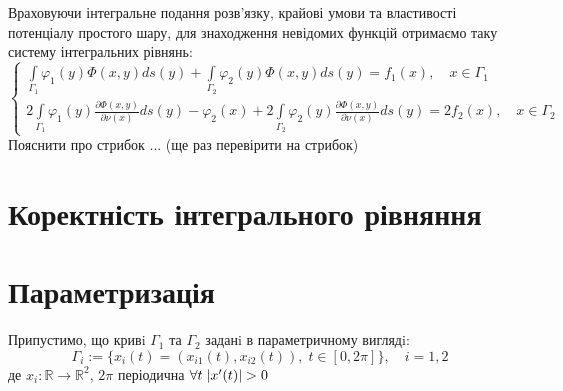 \documentclass[14pt,a4paper]{extarticle}
\newcounter{e}
\newcommand{\intl}{\int\limits}
\begin{document}
 Враховуючи інтегральне подання розв'язку, крайові умови та властивості потенціалу простого шару, для знаходження невідомих функцій отримаємо таку систему інтегральних рівнянь:
 $$
 \left\{
 \begin{array}{l}
 	\displaystyle
 	  \intl_{\Gamma_{1}} \varphi_1(y) \Phi(x, y) d s(y)
 	+ \intl_{\Gamma_{2}} \varphi_2(y) \Phi(x, y) d s(y)
 	= f_{1}(x), \quad x \in \Gamma_{1} 
 	\\ [0.3cm]
 	\displaystyle
 	  2\intl_{\Gamma_{1}} \varphi_1(y) \frac{\partial \Phi(x, y)}{\partial \nu(x)} d s(y)
 	- \varphi_2(x)
 	+ 2\intl_{\Gamma_{2}} \varphi_2(y) \frac{\partial \Phi(x, y)}{\partial \nu(x)} d s(y)
 	= 2f_{2}(x), \quad x \in \Gamma_{2}
 \end{array}\right.
 $$
 Пояснити про стрибок ...
 (ще раз перевірити на стрибок)
 

 
 
 \section{Коректність інтегрального рівняння}
 
 \section{Параметризація}
 

 Припустимо, що кривi $\Gamma_{1}$ та $\Gamma_{2}$ заданi в параметричному виглядi:
\begin{equation}
	 \Gamma_{i} := \{ x_{i}(t) = (x_{i1}(t), x_{i2}(t)), \; t \in [ 0, 2\pi ] \} , \quad i = 1, 2
\end{equation}
\indent де $x_{i} : \mathbb{R} \rightarrow \mathbb{R}^2$, $2\pi$ періодична $\forall{t} \; \abs{x'(t)} > 0$
\end{document}
